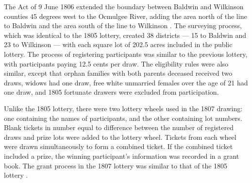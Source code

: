 The Act of 9 June 1806 extended the boundary between Baldwin and Wilkinson counties 45 degrees west to the Ocmulgee River, adding the area north of the line to Baldwin and the area south of the line to Wilkinson \citep{clayton1812}. The surveying process, which was identical to the 1805 lottery, created 38 districts --- 15 to Baldwin and 23 to Wilkinson --- with each square lot of 202.5 acres included in the public lottery. The process of registering participants was similar to the previous lottery, with participants paying 12.5 cents per draw. The eligibility rules were also similar, except that orphan families with both parents deceased received two draws, widows had one draw, free white unmarried females over the age of 21 had one draw, and 1805 fortunate drawers were excluded from participation. 

Unlike the 1805 lottery, there were two lottery wheels used in the 1807 drawing: one containing the names of participants, and the other containing lot numbers. Blank tickets in number equal to difference between the number of registered draws and prize lots were added to the lottery wheel. Tickets from each wheel were drawn simultaneously to form a combined ticket. If the combined ticket included a prize, the winning participant's information was recorded in a grant book. The grant process in the 1807 lottery was similar to that of the 1805 lottery \citep{graham2011}. 
%
%
%
